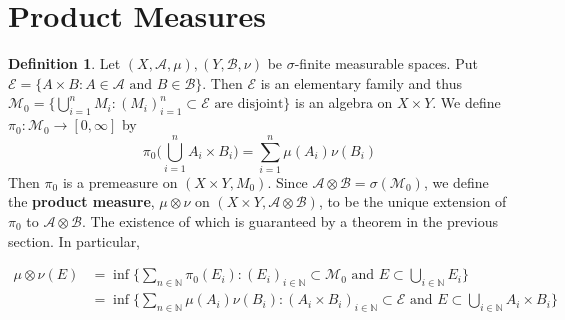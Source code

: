 \documentclass{book}
\theoremstyle{definition}
\newtheorem{defn}[definition]{Definition}
\newcommand{\sig}{\sigma}
\newcommand{\N}{\mathbb{N}}
\newcommand{\MA}{\mathcal{A}}
\newcommand{\MB}{\mathcal{B}}
\newcommand{\ME}{\mathcal{E}}
\newcommand{\MM}{\mathcal{M}}
\newcommand{\ld}[1]{\label{defn:#1}}
\DeclareMathOperator*{\0}{\mbf{0}}
\DeclareMathOperator*{\1}{\mbf{1}}
\newcommand{\RG}{[0,\infty]}
\begin{document}
	
	
	
	
	
	
	
	
	
	
	
	
	
	
	
	\newpage
	\section{Product Measures}
	
	\begin{defn} \ld{00000} 
		Let $(X,\MA, \mu), (Y,\MB, \nu)$ be $\sig$-finite measurable spaces. Put $\ME = \{A \times B: A \in \MA \text{ and } B \in \MB\}$. Then $\ME$ is an elementary family and thus $\MM_0 = \{\bigcup_{i =1}^n M_i: (M_i)_{i=1 }^n \subset \ME \text{ are disjoint}\}$ is an algebra on $X \times Y$. We define $\pi_0: \MM_0 \rightarrow \RG$ by $$\pi_0\bigg(\bigcup_{i=1}^n A_i \times B_i \bigg) = \sum_{i=1}^n\mu(A_i)\nu(B_i)$$ Then $\pi_0$ is a premeasure on $(X \times Y, M_0)$. Since $\MA \otimes \MB = \sig(\MM_0)$, we define the \textbf{product measure}, $\mu \otimes \nu$ on $(X \times Y, \MA \otimes \MB)$, to be the unique extension of $\pi_0$ to $\MA \otimes \MB$. The existence of which is guaranteed by a theorem in the previous section. In particular,
		
		\begin{align*}
			\mu \otimes \nu(E) 
			&= \inf \bigg\{\sum_{n \in \N}\pi_0(E_i): (E_i)_{i \in \N} \subset \MM_0 \text{ and } E \subset \bigcup_{i \in \N} E_i \bigg\}\\
			&= \inf \bigg\{\sum_{n \in \N}\mu(A_i)\nu(B_i): (A_i \times B_i)_{i \in \N} \subset \ME \text{ and } E \subset \bigcup_{i \in \N} A_i \times B_i \bigg \}
		\end{align*}
	\end{defn}
\end{document}
